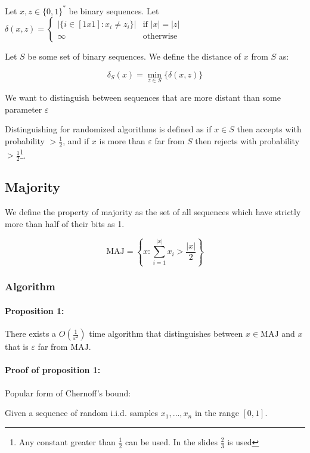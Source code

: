 \documentclass{idc_msc}
\begin{document}
Let \(x,z \in {\{0,1\}}^{*}\) be binary sequences.
Let \(\delta(x,z) = \begin{cases}|\{i \in [1x1] : x_i \ne z_i\}| & \textrm{if } |x| = |z| \\ \infty & \textrm{otherwise}\end{cases}\)

Let \(S\) be some set of binary sequences.
We define the distance of \(x\) from \(S\) as:

\[
  \delta_S(x) = \min_{z \in S} \{\delta(x,z)\}
\]

We want to distinguish between sequences that are more distant than some parameter \(\varepsilon\)

Distinguishing for randomized algorithms is defined as if \(x \in S\) then accepts with probability \(> \frac{1}{2}\), and if \(x\) is more than \(\varepsilon\) far from \(S\) then rejects with probability \(> \frac{1}{2}\)\footnote{Any constant greater than \(\frac{1}{2}\) can be used. In the slides \(\frac{2}{3}\) is used}.

\subsection{Majority}

We define the property of majority as the set of all sequences which have strictly more than half of their bits as 1.

\[
  \mathrm{MAJ} = \left\{x : \sum_{i = 1}^{|x|} x_i > \frac{|x|}{2}\right\}
\]

\subsubsection{Algorithm}

\paragraph{Proposition 1:}

There exists a \(O(\frac{1}{\varepsilon^2})\) time algorithm that distinguishes between \(x \in \mathrm{MAJ}\) and \(x\) that is \(\varepsilon\) far from \(\mathrm{MAJ}\).

\paragraph{Proof of proposition 1:}

Popular form of Chernoff's bound:

Given a sequence of random i.i.d. samples \(x_1, \ldots, x_n\) in the range \([0,1]\).
\end{document}

